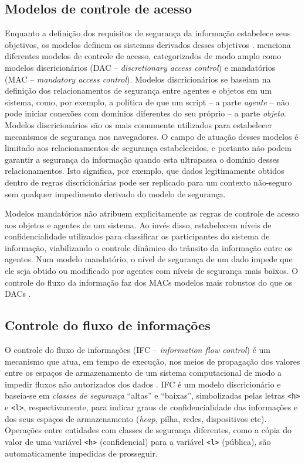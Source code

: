 \subsection{Modelos de controle de acesso}
Enquanto a definição dos requisitos de segurança da informação estabelece seus objetivos, os modelos definem os sistemas derivados desses objetivos \cite{Goguen1982}. \cite{Foster1998} menciona diferentes modelos de controle de acesso, categorizados de modo amplo como modelos discricionários (DAC -- \textit{discretionary access control}) e mandatórios (MAC -- \textit{mandatory access control}). Modelos discricionários se baseiam na definição dos relacionamentos de segurança entre agentes e objetos em um sistema, como, por exemplo, a política de que um script -- a parte \textit{agente} -- não pode iniciar conexões com domínios diferentes do seu próprio -- a parte \textit{objeto}. Modelos discricionários são os mais comumente utilizados para estabelecer mecanismos de segurança nos navegadores. O campo de atuação desses modelos é limitado aos relacionamentos de segurança estabelecidos, e portanto não podem garantir a segurança da informação quando esta ultrapassa o domínio desses relacionamentos. Isto significa, por exemplo, que dados legitimamente obtidos dentro de regras discricionárias pode ser replicado para um contexto não-seguro sem qualquer impedimento derivado do modelo de segurança.

Modelos mandatórios não atribuem explicitamente as regras de controle de acesso aos objetos e agentes de um sistema. Ao invés disso, estabelecem níveis de confidencialidade utilizados para classificar os participantes do sistema de informação, viabilizando o controle dinâmico do trânsito da informação entre os agentes. Num modelo mandatório, o nível de segurança de um dado impede que ele seja obtido ou modificado por agentes com níveis de segurança mais baixos. O controle do fluxo da informação faz dos MACs modelos mais robustos do que os DACs \cite{Foster1998}.

\subsection{Controle do fluxo de informações}
O controle do fluxo de informações (IFC -- \textit{information flow control}) é um mecanismo que atua, em tempo de execução, nos meios de propagação dos valores entre os espaços de armazenamento de um sistema computacional de modo a impedir fluxos não autorizados dos dados \cite{Denning1976}. IFC é um modelo discricionário e baseia-se em \textit{classes de segurança} ``altas'' e ``baixas'', simbolizadas pelas letras \texttt{<h>} e \texttt{<l>}, respectivamente, para indicar graus de confidencialidade das informações e dos seus espaços de armazenamento (\textit{heap}, pilha, redes, dispositivos etc). Operações entre entidades com classes de segurança diferentes, como a cópia do valor de uma variável \texttt{<h>} (confidencial) para a variável \texttt{<l>} (pública), são automaticamente impedidas de prosseguir.

